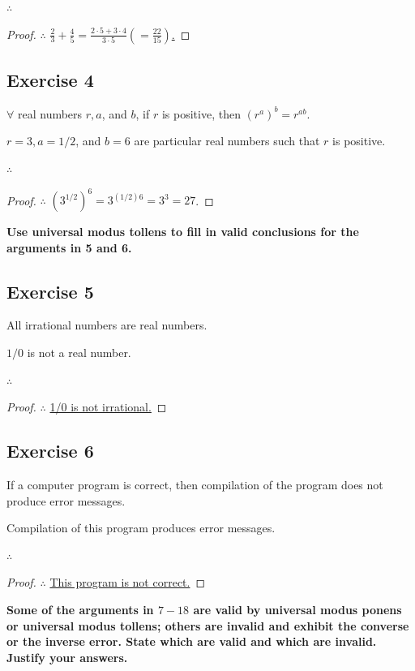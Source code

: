 \documentclass[14pt]{extarticle}
\newcommand{\dps}{\displaystyle}
\newcommand{\fbl}{\underline{\hspace{1cm}}\,\,}
\newcommand{\fa}{\forall}
\begin{document}
$\therefore$ \fbl

\begin{proof}
$\therefore$ \underline{$\dps \frac{2}{3} + \frac{4}{5} = \frac{2\cdot5 + 3\cdot4}{3\cdot5} \left( = \frac{22}{15}\right)$.}
\end{proof}

\subsection{Exercise 4}
$\fa$ real numbers $r, a$, and $b$, if $r$ is positive, then $(r^a)^b = r^{ab}$.

$r = 3, a = 1/2$, and $b = 6$ are particular real numbers such that $r$ is positive.

$\therefore$ \fbl

\begin{proof}
$\therefore$ \underline{$(3^{1/2})^{6} = 3^{(1/2)6} = 3^3 = 27$}.
\end{proof}

{\bf \color{cyan} Use universal modus tollens to fill in valid conclusions for the arguments in 5 and 6.}

\subsection{Exercise 5}
All irrational numbers are real numbers.

$1/0$ is not a real number.

$\therefore$ \fbl

\begin{proof}
$\therefore$ \underline{1/0 is not irrational.}
\end{proof}

\subsection{Exercise 6}
If a computer program is correct, then compilation of the program does not produce error messages.

Compilation of this program produces error messages.

$\therefore$ \fbl

\begin{proof}
$\therefore$ \underline{This program is not correct.}
\end{proof}

{\bf \color{cyan} Some of the arguments in $7-18$ are valid by universal modus ponens or universal modus tollens; others are invalid and exhibit the converse or the inverse error. State which are valid and which are invalid. Justify your answers.}
\end{document}
